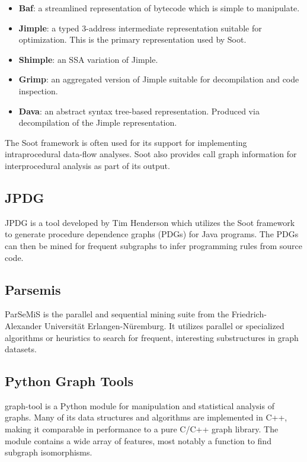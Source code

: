 \documentclass[12pt]{article}
\begin{document}
\begin{itemize}
    \item\textbf{Baf}: a streamlined representation of bytecode which is simple to manipulate.
    \item\textbf{Jimple}: a typed 3-address intermediate representation suitable for optimization. This is the primary representation used by Soot.
    \item\textbf{Shimple}: an SSA variation of Jimple.
    \item\textbf{Grimp}: an aggregated version of Jimple suitable for decompilation and code inspection.
    \item\textbf{Dava}: an abstract syntax tree-based representation. Produced via decompilation of the Jimple representation.
\end{itemize}
The Soot framework is often used for its support for implementing intraprocedural data-flow analyses. Soot also provides call graph information for interprocedural analysis as part of its output. 

\subsection{JPDG}
\label{subsection:JPDG}
JPDG is a tool developed by Tim Henderson which utilizes the Soot framework to generate procedure dependence graphs (PDGs) for Java programs. The PDGs can then be mined for frequent subgraphs to infer programming rules from source code.

\subsection{Parsemis}
ParSeMiS is the parallel and sequential mining suite from the Friedrich-Alexander Universit{\"a}t Erlangen-N{\"u}remburg. It utilizes parallel or specialized algorithms or heuristics to search for frequent, interesting substructures in graph datasets.

\subsection{Python Graph Tools}
graph-tool is a Python module for manipulation and statistical analysis of
graphs. Many of its data structures and algorithms are implemented in C++,
making it comparable in performance to a pure C/C++ graph library. The module
contains a wide array of features, most notably a function to find subgraph
isomorphisms.
\end{document}
